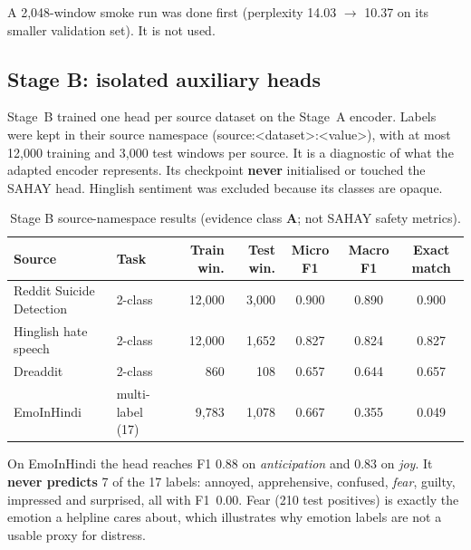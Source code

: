 \documentclass[11pt,a4paper]{article}
\newcommand{\codeus}{\textunderscore\allowbreak}
\DeclareRobustCommand{\code}[1]{{\ttfamily\let\_\codeus #1}}
\newcommand{\evA}{\textsf{\textbf{A}}}
\begin{document}
\noindent A 2{,}048-window smoke run was done first (perplexity 14.03 $\to$ 10.37 on its smaller
validation set). It is not used.

\subsection{Stage B: isolated auxiliary heads}
\label{sec:stageB}
Stage~B trained one head per source dataset on the Stage~A encoder. Labels were kept in their source
namespace (\code{source:<dataset>:<value>}), with at most 12{,}000 training and 3{,}000 test windows
per source. It is a diagnostic of what the adapted encoder represents. Its checkpoint
\textbf{never} initialised or touched the SAHAY head. Hinglish sentiment was excluded because its
classes are opaque.

\begin{table}[!htbp]
\centering\small
\caption{Stage B source-namespace results (evidence class \evA; not SAHAY safety metrics).}
\label{tab:stageB}
\setlength{\tabcolsep}{5pt}
\begin{tabular}{@{}llrrccc@{}}
\toprule
Source & Task & Train win. & Test win. & Micro F1 & Macro F1 & Exact match \\
\midrule
Reddit Suicide Detection & 2-class & 12{,}000 & 3{,}000 & 0.900 & 0.890 & 0.900 \\
Hinglish hate speech & 2-class & 12{,}000 & 1{,}652 & 0.827 & 0.824 & 0.827 \\
Dreaddit & 2-class & 860 & 108 & 0.657 & 0.644 & 0.657 \\
EmoInHindi & multi-label (17) & 9{,}783 & 1{,}078 & 0.667 & 0.355 & 0.049 \\
\bottomrule
\end{tabular}
\end{table}

\noindent On EmoInHindi the head reaches F1 0.88 on \emph{anticipation} and 0.83 on \emph{joy}.
It \textbf{never predicts} 7 of the 17 labels: annoyed, apprehensive, confused, \emph{fear}, guilty,
impressed and surprised, all with F1~0.00. Fear (210 test positives) is exactly the emotion a
helpline cares about, which illustrates why emotion labels are not a usable proxy for distress.
\end{document}
